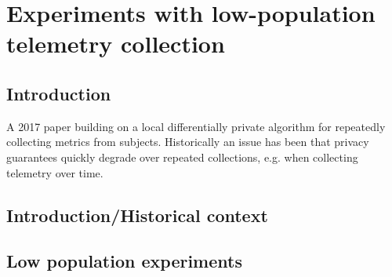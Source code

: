 \documentclass[12pt]{article}
\begin{document}
\section{Experiments with low-population telemetry collection \label{sec:telemetry}}

\subsection{Introduction}

A 2017 paper building on a local differentially private algorithm for repeatedly collecting metrics from subjects. Historically an issue has been that privacy guarantees quickly degrade over repeated collections, e.g. when collecting telemetry over time.

\subsection{Introduction/Historical context}

\subsection{Low population experiments}
\end{document}
